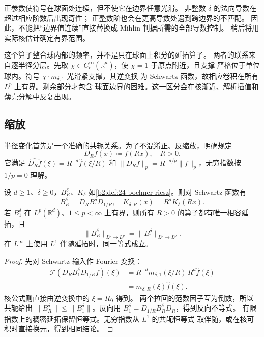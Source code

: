 \ProseParagraphBreak
正参数使符号在球面处连续，但不使它在边界任意光滑。
非整数 \(\delta\) 的法向导数在超过相应阶数后出现奇性；
正整数阶也会在更高导数处遇到跨边界的不匹配。
因此，不能把“边界值连续”直接替换成 Mihlin 判据所需的全部导数控制。
稍后将用实际核估计确定有界范围。

\ProseParagraphBreak
这个算子整合球内部的频率，并不是只在球面上积分的延拓算子。
两者的联系来自逐半径分层。先取
\(\chi\in C_c^\infty(\mathbb R^d)\)，使 \(\chi=1\) 于原点附近，且支撑
严格位于单位球内。符号 \(\chi\cdot m_{\delta,1}\) 光滑紧支撑，其逆变换
为 Schwartz 函数，故相应卷积在所有 \(L^p\) 上有界。剩余部分才包含
球面边界的困难。这一区分会在核渐近、解析插值和薄壳分解中反复出现。

\subsection{缩放}
\label{b2:subsec:240102}

半径变化首先是一个准确的共轭关系。为了不混淆正、反缩放，明确规定
\[
 D_Rf(x)\coloneqq f(Rx),\quad R>0.
\]
它满足
\(\widehat{D_Rf}(\xi)=R^{-d}\widehat f(\xi/R)\) 和
\(\|D_Rf\|_p=R^{-d/p}\|f\|_p\)，无穷指数按 \(1/p=0\) 理解。

\begin{proposition}[半径共轭与一致常数]\label{b2:prop:24-dilation}
设 \(d\geq1\)、\(\delta\geq0\)，\(B_R^\delta\)、\(K_\delta\)
如\cref{b2:def:24-bochner-riesz}。则对 Schwartz 函数有
\[
 B_R^\delta=D_R B_1^\delta D_{1/R},\quad
 K_{\delta,R}(x)=R^dK_\delta(Rx).
\]
若 \(B_1^\delta\) 在 \(L^p(\mathbb R^d)\)、\(1\leq p<\infty\)
上有界，则所有 \(R>0\) 的算子都有唯一相容延拓，且
\[
 \|B_R^\delta\|_{L^p\to L^p}
       =\|B_1^\delta\|_{L^p\to L^p}.
\]
在 \(L^\infty\) 上使用 \(L^1\) 伴随延拓时，同一等式成立。
\end{proposition}
\begin{proof}
先对 Schwartz 输入作 Fourier 变换：
\[
 \begin{aligned}
 \mathcal F(D_R B_1^\delta D_{1/R}f)(\xi)
 &=R^{-d}m_{\delta,1}(\xi/R)\,
             R^d\widehat f(\xi)\\
 &=m_{\delta,R}(\xi)\widehat f(\xi).
 \end{aligned}
\]
核公式则直接由逆变换中的 \(\xi=R\eta\) 得到。
两个拉回的范数因子互为倒数，所以共轭给出
\(\|B_R^\delta\|\leq\|B_1^\delta\|\)。反向用
\(B_1^\delta=D_{1/R}B_R^\delta D_R\)，得到反向不等式。
有限指数上的稠密延拓保留恒等式。无穷指数从 \(L^1\) 的共轭恒等式
取伴随，或在核可积时直接换元，得到相同结论。
\end{proof}


